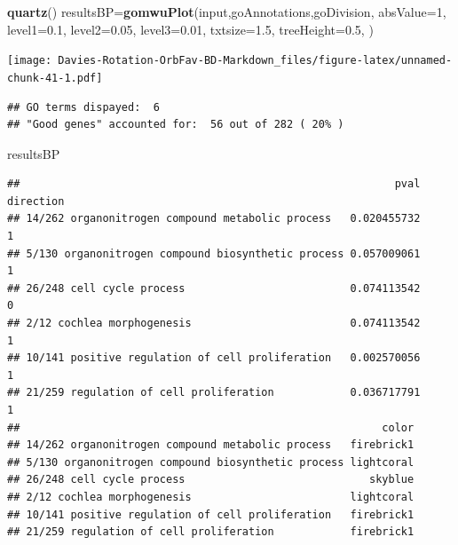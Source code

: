 \documentclass[
]{article}
\newenvironment{Shaded}{\begin{snugshade}}{\end{snugshade}}
\newcommand{\DataTypeTok}[1]{\textcolor[rgb]{0.13,0.29,0.53}{#1}}
\newcommand{\DecValTok}[1]{\textcolor[rgb]{0.00,0.00,0.81}{#1}}
\newcommand{\FloatTok}[1]{\textcolor[rgb]{0.00,0.00,0.81}{#1}}
\newcommand{\KeywordTok}[1]{\textcolor[rgb]{0.13,0.29,0.53}{\textbf{#1}}}
\newcommand{\NormalTok}[1]{#1}
\begin{document}
\begin{Shaded}
\begin{Highlighting}[]
\KeywordTok{quartz}\NormalTok{()}
\NormalTok{resultsBP=}\KeywordTok{gomwuPlot}\NormalTok{(input,goAnnotations,goDivision,}
                  \DataTypeTok{absValue=}\DecValTok{1}\NormalTok{,}
                  \DataTypeTok{level1=}\FloatTok{0.1}\NormalTok{,}
                  \DataTypeTok{level2=}\FloatTok{0.05}\NormalTok{,}
                  \DataTypeTok{level3=}\FloatTok{0.01}\NormalTok{,}
                  \DataTypeTok{txtsize=}\FloatTok{1.5}\NormalTok{,}
                  \DataTypeTok{treeHeight=}\FloatTok{0.5}\NormalTok{,}
\NormalTok{)}
\end{Highlighting}
\end{Shaded}

\texttt{[image: Davies-Rotation-OrbFav-BD-Markdown\_files/figure-latex/unnamed-chunk-41-1.pdf]}

\begin{verbatim}
## GO terms dispayed:  6 
## "Good genes" accounted for:  56 out of 282 ( 20% )
\end{verbatim}

\begin{Shaded}
\begin{Highlighting}[]
\NormalTok{resultsBP}
\end{Highlighting}
\end{Shaded}

\begin{verbatim}
##                                                           pval direction
## 14/262 organonitrogen compound metabolic process   0.020455732         1
## 5/130 organonitrogen compound biosynthetic process 0.057009061         1
## 26/248 cell cycle process                          0.074113542         0
## 2/12 cochlea morphogenesis                         0.074113542         1
## 10/141 positive regulation of cell proliferation   0.002570056         1
## 21/259 regulation of cell proliferation            0.036717791         1
##                                                         color
## 14/262 organonitrogen compound metabolic process   firebrick1
## 5/130 organonitrogen compound biosynthetic process lightcoral
## 26/248 cell cycle process                             skyblue
## 2/12 cochlea morphogenesis                         lightcoral
## 10/141 positive regulation of cell proliferation   firebrick1
## 21/259 regulation of cell proliferation            firebrick1
\end{verbatim}
\end{document}
